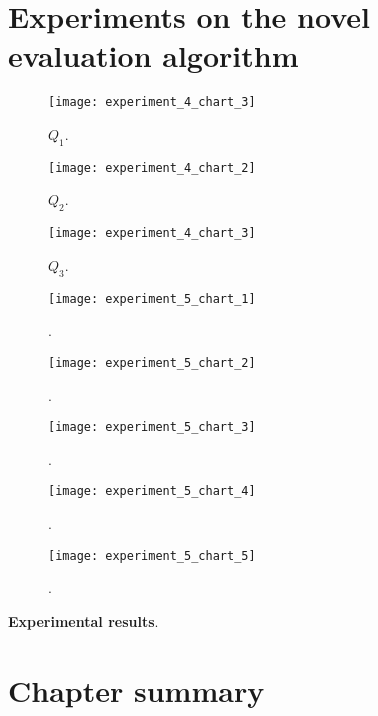 \section{Experiments on the novel evaluation algorithm}\label{sec:new-algorithm}

\begin{figure}[H]
  \centering
  \texttt{[image: experiment\_4\_chart\_3]}
  \caption{$Q_{1}$.}
  \label{fig:???}
\end{figure}
\begin{figure}[H]
  \centering
  \texttt{[image: experiment\_4\_chart\_2]}
  \caption{$Q_{2}$.}
  \label{fig:???}
\end{figure}
\begin{figure}[H]
  \centering
  \texttt{[image: experiment\_4\_chart\_3]}
  \caption{$Q_{3}$.}
  \label{fig:???}
\end{figure}


\begin{figure}[H]
  \centering
  \texttt{[image: experiment\_5\_chart\_1]}
  \caption{.}
  \label{fig:???}
\end{figure}

\begin{figure}[H]
  \centering
  \texttt{[image: experiment\_5\_chart\_2]}
  \caption{.}
  \label{fig:???}
\end{figure}

\begin{figure}[H]
  \centering
  \texttt{[image: experiment\_5\_chart\_3]}
  \caption{.}
  \label{fig:???}
\end{figure}

\begin{figure}[H]
  \centering
  \texttt{[image: experiment\_5\_chart\_4]}
  \caption{.}
  \label{fig:???}
\end{figure}

\begin{figure}[H]
  \centering
  \texttt{[image: experiment\_5\_chart\_5]}
  \caption{.}
  \label{fig:???}
\end{figure}

\textbf{Experimental results}.

\section{Chapter summary}
